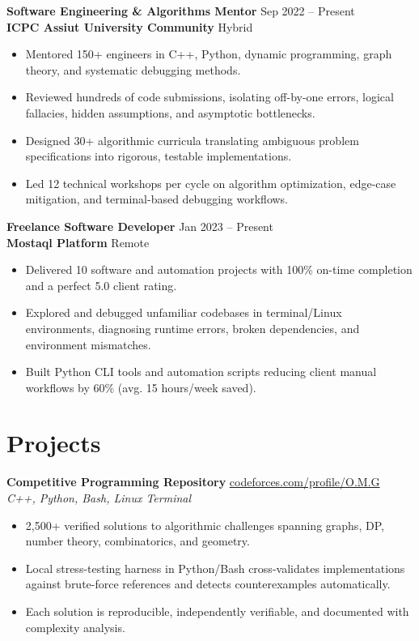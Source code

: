 \documentclass[letterpaper,10pt]{article}
\begin{document}
\vspace{3pt}
\textbf{Software Engineering \& Algorithms Mentor} \hfill Sep 2022 -- Present\\
\textbf{ICPC Assiut University Community} \hfill Hybrid
\begin{itemize}
  \item Mentored 150+ engineers in C++, Python, dynamic programming, graph theory, and systematic debugging methods.
  \item Reviewed hundreds of code submissions, isolating off-by-one errors, logical fallacies, hidden assumptions, and asymptotic bottlenecks.
  \item Designed 30+ algorithmic curricula translating ambiguous problem specifications into rigorous, testable implementations.
  \item Led 12 technical workshops per cycle on algorithm optimization, edge-case mitigation, and terminal-based debugging workflows.
\end{itemize}

\vspace{3pt}
\textbf{Freelance Software Developer} \hfill Jan 2023 -- Present\\
\textbf{Mostaql Platform} \hfill Remote
\begin{itemize}
  \item Delivered 10 software and automation projects with 100\% on-time completion and a perfect 5.0 client rating.
  \item Explored and debugged unfamiliar codebases in terminal/Linux environments, diagnosing runtime errors, broken dependencies, and environment mismatches.
  \item Built Python CLI tools and automation scripts reducing client manual workflows by 60\% (avg. 15 hours/week saved).
\end{itemize}

\section{Projects}

\textbf{Competitive Programming Repository} \hfill \href{https://codeforces.com/profile/O.M.G}{codeforces.com/profile/O.M.G}\\
\textit{C++, Python, Bash, Linux Terminal}
\begin{itemize}
  \item 2,500+ verified solutions to algorithmic challenges spanning graphs, DP, number theory, combinatorics, and geometry.
  \item Local stress-testing harness in Python/Bash cross-validates implementations against brute-force references and detects counterexamples automatically.
  \item Each solution is reproducible, independently verifiable, and documented with complexity analysis.
\end{itemize}
\end{document}
